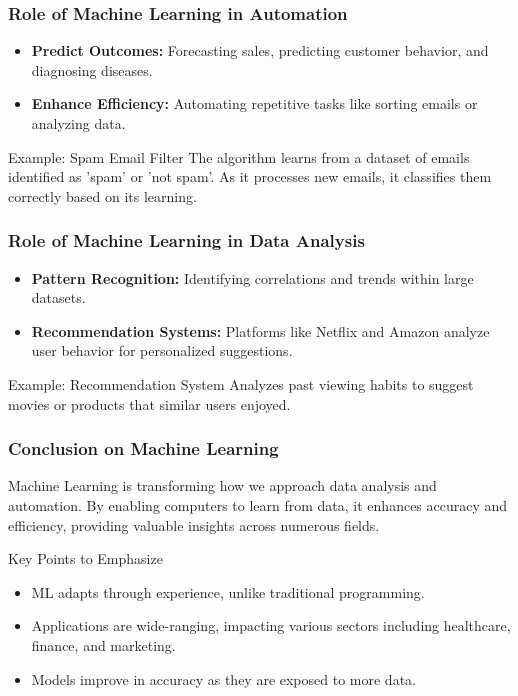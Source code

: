 \documentclass[aspectratio=169]{beamer}
\begin{document}
\begin{frame}[fragile]
    \frametitle{Role of Machine Learning in Automation}
    
    \begin{itemize}
        \item \textbf{Predict Outcomes:} Forecasting sales, predicting customer behavior, and diagnosing diseases.
        \item \textbf{Enhance Efficiency:} Automating repetitive tasks like sorting emails or analyzing data.
    \end{itemize}
    
    \begin{block}{Example: Spam Email Filter}
        The algorithm learns from a dataset of emails identified as 'spam' or 'not spam'. As it processes new emails, it classifies them correctly based on its learning.
    \end{block}
\end{frame}

\begin{frame}[fragile]
    \frametitle{Role of Machine Learning in Data Analysis}
    
    \begin{itemize}
        \item \textbf{Pattern Recognition:} Identifying correlations and trends within large datasets.
        \item \textbf{Recommendation Systems:} Platforms like Netflix and Amazon analyze user behavior for personalized suggestions.
    \end{itemize}
    
    \begin{block}{Example: Recommendation System}
        Analyzes past viewing habits to suggest movies or products that similar users enjoyed.
    \end{block}
\end{frame}

\begin{frame}[fragile]
    \frametitle{Conclusion on Machine Learning}
    
    Machine Learning is transforming how we approach data analysis and automation. By enabling computers to learn from data, it enhances accuracy and efficiency, providing valuable insights across numerous fields.
    
    \begin{block}{Key Points to Emphasize}
        \begin{itemize}
            \item ML adapts through experience, unlike traditional programming.
            \item Applications are wide-ranging, impacting various sectors including healthcare, finance, and marketing.
            \item Models improve in accuracy as they are exposed to more data.
        \end{itemize}
    \end{block}
\end{frame}
\end{document}
